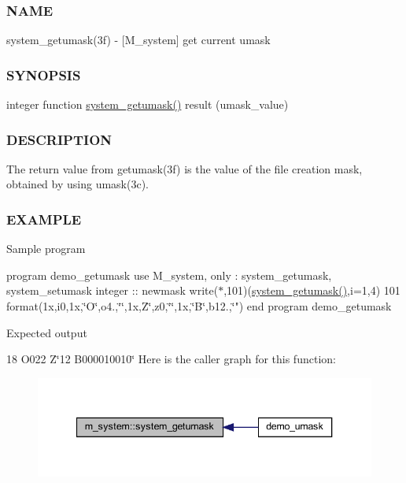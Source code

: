 \subsubsection*{N\+A\+ME}

system\+\_\+getumask(3f) -\/ \mbox{[}M\+\_\+system\mbox{]} get current umask \subsubsection*{S\+Y\+N\+O\+P\+S\+IS}

integer function \hyperlink{namespacem__system_aa9ca951be39d2ea738d627cf42c00ddd}{system\+\_\+getumask()} result (umask\+\_\+value) \subsubsection*{D\+E\+S\+C\+R\+I\+P\+T\+I\+ON}

The return value from getumask(3f) is the value of the file creation mask, obtained by using umask(3c). \subsubsection*{E\+X\+A\+M\+P\+LE}

Sample program

program demo\+\_\+getumask use M\+\_\+system, only \+: system\+\_\+getumask, system\+\_\+setumask integer \+:\+: newmask write($\ast$,101)(\hyperlink{namespacem__system_aa9ca951be39d2ea738d627cf42c00ddd}{system\+\_\+getumask()},i=1,4) 101 format(1x,i0,1x,\char`\"{}\+O\textquotesingle{}\char`\"{},o4.,\char`\"{}\textquotesingle{}\char`\"{},1x,\textquotesingle{}Z\char`\"{}\textquotesingle{},z0,\char`\"{}\textquotesingle{}\char`\"{},1x,\char`\"{}B\textquotesingle{}\char`\"{},b12.,\char`\"{}\textquotesingle{}") end program demo\+\_\+getumask

Expected output

18 O\textquotesingle{}022\textquotesingle{} Z\char`\"{}12\textquotesingle{} B\textquotesingle{}000010010\char`\"{} Here is the caller graph for this function\+:
\nopagebreak
\begin{figure}[H]
\begin{center}
\leavevmode
\includegraphics[width=340pt]{namespacem__system_aa9ca951be39d2ea738d627cf42c00ddd_icgraph}
\end{center}
\end{figure}
\mbox{\label{namespacem__system_a791fa587005ec07cbcd7b0045ee6f43f}} 
